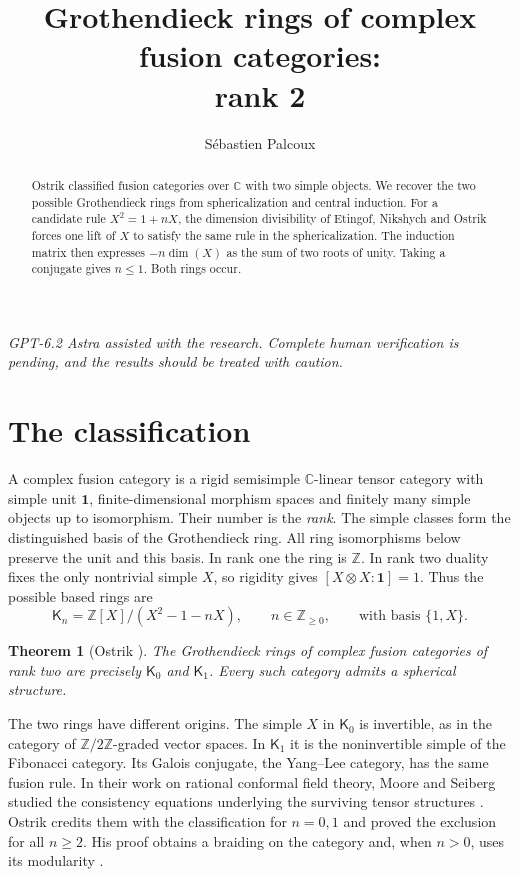 \documentclass[11pt,a4paper]{article}
\title{Grothendieck rings of complex fusion categories:\\rank 2}
\author{Sébastien Palcoux}
\date{}
\newtheorem{theorem}{Theorem}[section]
\newcommand{\C}{\mathbb C}
\newcommand{\Z}{\mathbb Z}
\newcommand{\one}{\mathbf 1}
\newcommand{\Kn}{\mathsf K}
\numberwithin{equation}{section}
\begin{document}
\raggedbottom
\maketitle
\begin{abstract}
Ostrik classified fusion categories over $\mathbb C$ with two simple
objects. We recover the two possible Grothendieck rings from
sphericalization and central induction. For a candidate rule
$X^2=1+nX$, the dimension divisibility of Etingof, Nikshych and Ostrik
forces one lift of $X$ to satisfy the same rule in the sphericalization.
The induction matrix then expresses $-n\dim(X)$ as the sum of two roots
of unity. Taking a conjugate gives $n\leq 1$. Both rings occur.
\end{abstract}
\par\smallskip
\begin{center}\begin{minipage}{0.88\linewidth}\small\itshape
GPT-6.2 Astra assisted with the research. Complete human verification is
pending, and the results should be treated with caution.
\end{minipage}\end{center}

\section{The classification}

A complex fusion category is a rigid semisimple $\C$-linear tensor
category with simple unit $\one$, finite-dimensional morphism spaces and
finitely many simple objects up to isomorphism. Their number is the
\emph{rank}. The simple classes form the distinguished basis of the
Grothendieck ring. All ring isomorphisms below preserve the unit and
this basis. In rank one the ring is $\Z$. In rank two duality fixes
the only nontrivial simple $X$, so rigidity gives
$[X\otimes X:\one]=1$. Thus the possible based rings are
\[
 \Kn_n=\Z[X]/(X^2-1-nX),\qquad n\in\Z_{\geq0},
 \qquad\text{with basis }\{1,X\}.
\]

\begin{theorem}[Ostrik {\cite{OstrikRank2}}]\label{thm:main}
The Grothendieck rings of complex fusion categories of rank two are
precisely $\Kn_0$ and $\Kn_1$. Every such category admits a spherical
structure.
\end{theorem}

The two rings have different origins. The simple $X$ in $\Kn_0$ is
invertible, as in the category of $\Z/2\Z$-graded vector spaces.
In $\Kn_1$ it is the noninvertible simple of the Fibonacci category.
Its Galois conjugate, the Yang--Lee category, has the same fusion rule.
In their work on rational conformal field theory, Moore and Seiberg
studied the consistency equations underlying the surviving tensor
structures \cite{MooreSeiberg}. Ostrik credits them with the
classification for $n=0,1$ and proved the exclusion for all $n\geq2$.
His proof obtains a braiding on the category and, when $n>0$, uses its
modularity \cite[Sections~2.1--2.3]{OstrikRank2}.
\end{document}
